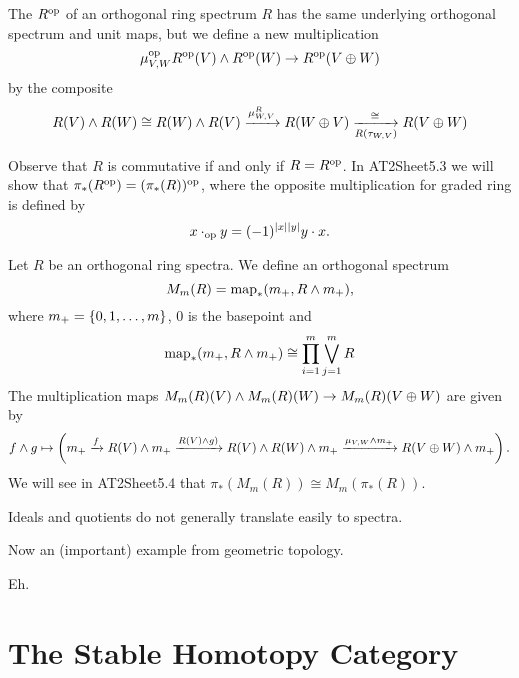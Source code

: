 
\begin{example}
The  $R^{\operatorname{op}}$ of an orthogonal ring spectrum $R$ has the same underlying orthogonal spectrum and unit maps, but we define a new multiplication
\[
\mu^{\operatorname{op}}_{V,W}R^{\operatorname{op}}(V)\wedge R^{\operatorname{op}}(W)\to R^{\operatorname{op}}(V\oplus W)\]
by the composite
\[R(V)\wedge R(W)\cong R(W)\wedge R(V)\xrightarrow{\mu^R_{W,V}}R(W\oplus V)\underset{R(\tau_{W,V})}{\xrightarrow{\quad\cong\quad}}R(V\oplus W)
\]

Observe that $R$ is commutative if and only if $R=R^{\operatorname{op}}$. In AT2Sheet5.3 we will show that $\pi_*(R^{\operatorname{op}})=(\pi_*(R))^{\operatorname{op}}$, where the opposite multiplication for graded ring is defined by
\[x\cdot_{\operatorname{op}} y=(-1)^{|x||y|}y\cdot x.\]
\end{example}

Let $R$ be an orthogonal ring spectra. We define an orthogonal spectrum
\[M_m(R)=\operatorname{map}_*(m_+,R\wedge m_+),\]
where $m_+=\{0,1,\dots,m\}$, $0$ is the basepoint and
\[\operatorname{map}_*(m_+,R\wedge m_+)\cong\prod_{i=1}^m\bigvee_{j=1}^m R\]
The multiplication maps $M_m(R)(V) \wedge M_m(R)(W) \to M_m(R)(V \oplus W)$ are given by
\[f\wedge g\mapsto\left(m_+ \xrightarrow{f} R(V) \wedge m_+ \xrightarrow{R(V) \wedge g)} R(V) \wedge R(W) \wedge m_+ \xrightarrow{\mu_{V,W} \wedge m_+} R(V \oplus W) \wedge m_+ \right).\]
We will see in AT2Sheet5.4 that $\pi_*(M_m(R)) \cong M_m(\pi_*(R))$.

\begin{remark}
Ideals and quotients do not generally translate easily to spectra.
\end{remark}

Now an (important) example from geometric topology.

\begin{example}
Eh.

\medskip
{}

\end{example}

\chapter{The Stable Homotopy Category}

